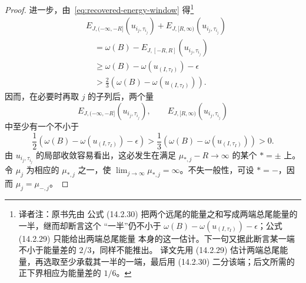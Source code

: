 \begin{proof}
进一步，由~\eqref{eq:recovered-energy-window} 得\footnote{译者注：原书先由
公式 (14.2.30) 把两个远尾的能量之和写成两端总尾能量的一半，继而却断言这个
“一半”仍不小于
$\omega(B)-\omega(u_{(I,\tau_I)})-\epsilon$；公式 (14.2.29) 只能给出两端总尾能量
本身的这一估计。下一句又据此断言某一端不小于能量差的 $2/3$，同样不能推出。
译文先用 (14.2.29) 估计两端总尾能量，再选取至少承载其一半的一端，最后用
(14.2.30) 二分该端；后文所需的正下界相应为能量差的 $1/6$。}
\[
  \begin{aligned}
  &E_{J,(-\infty,-R]}(u_{i_j,\tau_{i_j}})
    +E_{J,[R,\infty)}(u_{i_j,\tau_{i_j}})\\
  &\quad=
    \omega(B)-E_{J,[-R,R]}(u_{i_j,\tau_{i_j}})\\
  &\quad\geq
    \omega(B)-\omega(u_{(I,\tau_I)})-\epsilon\\
  &\quad>
    \frac23\left(
      \omega(B)-\omega(u_{(I,\tau_I)})
    \right).
  \end{aligned}
\]
因而，在必要时再取 $j$ 的子列后，两个量
\[
  E_{J,(-\infty,-R]}(u_{i_j,\tau_{i_j}}),
  \qquad
  E_{J,[R,\infty)}(u_{i_j,\tau_{i_j}})
\]
中至少有一个不小于
\[
  \frac12\left(
    \omega(B)-\omega(u_{(I,\tau_I)})-\epsilon
  \right)
  >
  \frac13\left(
    \omega(B)-\omega(u_{(I,\tau_I)})
  \right)>0.
\]
由 $u_{i_j,\tau_{i_j}}$ 的局部收敛容易看出，这必发生在满足
$\mu_{*,j}-R\to\infty$ 的某个 $*=\pm$ 上。令 $\mu_j$ 为相应的
$\mu_{*,j}$ 之一，使 $\lim_{j\to\infty}\mu_{*,j}=\infty$。不失一般性，可设
$*=-$，因而 $\mu_j=\mu_{-,j}$。


\end{proof}
